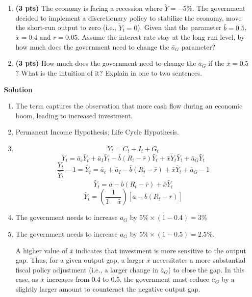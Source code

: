 \documentclass[14pt, oneside]{memoir}
\begin{document}
\begin{enumerate}[label=\textbf{\arabic*.}, itemsep=15pt]
\begin{enumerate}[label=(\alph*)]
	\clearpage
	
	\item \textbf{(3 pts)} The economy is facing a recession where $\widetilde{Y} = -5\%$. The government decided to implement a discretionary policy to stabilize the economy, move the short-run output to zero (i.e., $\tilde{Y}_t = 0$). Given that the parameter $\bar{b} = 0.5$, $\bar{x} = 0.4$ and $\bar{r} = 0.05$. Assume the interest rate stay at the long run level, by how much does the government need to change the $\bar{a}_G$ parameter? 
	

	\vspace{10cm}
	\item \textbf{(3 pts)} 	How much does the government need to change the $\bar{a}_G$ if the $\bar{x} = 0.5$? What is the intuition of it? Explain in one to two sentences.
\end{enumerate}

\clearpage
\textbf{Solution}
\begin{enumerate}[label=(\alph*)]
	\item The term captures the observation that more cash flow during an economic boom, leading to increased investment.

	\item  Permanent Income Hypothesis; Life Cycle Hypothesis.
	
	\item 
		\[Y_t = C_t + I_t + G_t \]
		\[Y_t = \bar{a}_c \bar{Y}_t + \bar{a}_I \bar{Y}_t  - \bar{b} \left(R_t - \bar{r}\right) \bar{Y}_t + \bar{x} \widetilde{Y_t} \bar{Y}_t + \bar{a}_G \bar{Y}_t \] 
		\[\frac{Y_t}{\bar{Y}_t}-1 =\widetilde{Y_t} = \bar{a}_c + \bar{a}_I  - \bar{b} \left(R_t - \bar{r}\right)  + \bar{x} \widetilde{Y_t} + \bar{a}_G -1 \] 
		\[\widetilde{Y_t} = \bar{a} - \bar{b} \left(R_t - \bar{r}\right)  + \bar{x} \widetilde{Y_t}   \] 
		\[\widetilde{Y_t} = \left(\frac{1}{1-\bar{x}}\right)\left[\bar{a} - \bar{b} \left(R_t - \bar{r}\right) \right]  \]
	
	
	\item  The government needs to increase $a_G$ by $5\% \times \left(1-0.4\right) = 3\%$

	\item The government needs to increase $a_G$ by $5\% \times \left(1-0.5\right) = 2.5\%$. 
	
	A higher value of \(\bar{x}\) indicates that investment is more sensitive to the output gap. Thus, for a given output gap, a larger \(\bar{x}\) necessitates a more substantial fiscal policy adjustment (i.e., a larger change in \(\bar{a}_G\)) to close the gap. In this case, as \(\bar{x}\) increases from 0.4 to 0.5, the government must reduce \(\bar{a}_G\) by a slightly larger amount to counteract the negative output gap.
	

\end{enumerate}
\end{enumerate}
\end{document}
